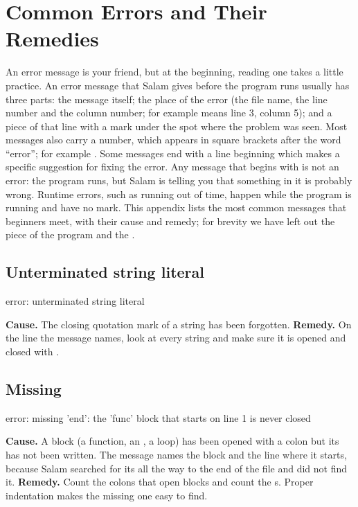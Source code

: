 \chapter{Common Errors and Their Remedies}\label{app:errors}

An error message is your friend, but at the beginning, reading one takes a
little practice. An error message that Salam gives before the program runs
usually has three parts: the message itself; the place of the error (the
file name, the line number and the column number; for example
 means line 3, column 5); and a piece of that line with
a \code{\textasciicircum} mark under the spot where the problem was seen.
Most messages also carry a number, which appears in square brackets after
the word ``error''; for example . Some messages end with a
line beginning  which makes a specific suggestion for fixing
the error. Any message that begins with  is not an error: the
program runs, but Salam is telling you that something in it is probably
wrong. Runtime errors, such as running out of time, happen while the program
is running and have no \code{\textasciicircum} mark. This
appendix lists the most common messages that beginners meet, with their
cause and remedy; for brevity we have left out the piece of the program and
the \code{\textasciicircum}.

\section*{Unterminated string literal}

\begin{plainout}
error: unterminated string literal
\end{plainout}

\textbf{Cause.} The closing quotation mark of a string has been forgotten.
\textbf{Remedy.} On the line the message names, look at every string and
make sure it is opened and closed with .

\section*{Missing }

\begin{plainout}
error: missing 'end': the 'func' block that starts on line 1 is never closed
\end{plainout}

\textbf{Cause.} A block (a function, an , a loop) has been opened
with a colon but its  has not been written. The message names
the block and the line where it starts, because Salam searched for its
 all the way to the end of the file and did not find it.
\textbf{Remedy.} Count the colons that open blocks and count the
s. Proper indentation makes the missing one easy to find.

